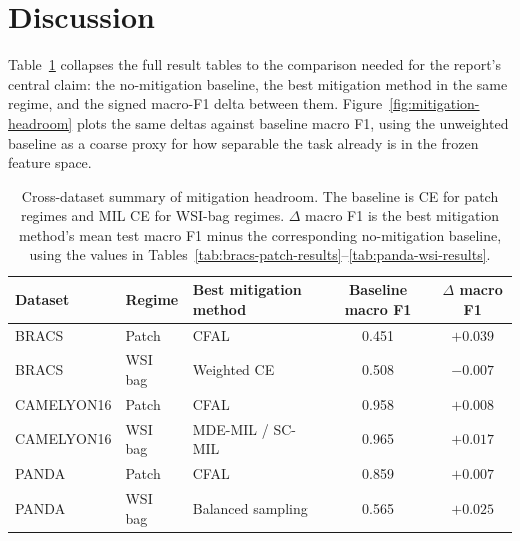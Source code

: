 \documentclass[11pt]{article}
\begin{document}
\begin{table}[ht]
  \centering
  \caption{PANDA native WSI-bag calibration: ECE before and after temperature scaling, with the fitted temperature $T$. Columns as in Table~\ref{tab:panda-calibration-patch}.}
  \label{tab:panda-calibration-wsi}
\end{table}

\section{Discussion}
\label{sec:discussion}
Table~\ref{tab:discussion-summary} collapses the full result tables to the comparison needed for the report's central claim: the no-mitigation baseline, the best mitigation method in the same regime, and the signed macro-F1 delta between them. Figure~\ref{fig:mitigation-headroom} plots the same deltas against baseline macro F1, using the unweighted baseline as a coarse proxy for how separable the task already is in the frozen feature space.

\begin{table}[ht]
  \centering
  \small
  \begin{tabularx}{\linewidth}{@{}llXcc@{}}
    \toprule
    Dataset & Regime & Best mitigation method & Baseline macro F1 & $\Delta$ macro F1\\
    \midrule
    BRACS & Patch & CFAL & \num{0.451} & $+\num{0.039}$\\
    BRACS & WSI bag & Weighted CE & \num{0.508} & $\num{-0.007}$\\
    CAMELYON16 & Patch & CFAL & \num{0.958} & $+\num{0.008}$\\
    CAMELYON16 & WSI bag & MDE-MIL / SC-MIL & \num{0.965} & $+\num{0.017}$\\
    PANDA & Patch & CFAL & \num{0.859} & $+\num{0.007}$\\
    PANDA & WSI bag & Balanced sampling & \num{0.565} & $+\num{0.025}$\\
    \bottomrule
  \end{tabularx}
  \caption{Cross-dataset summary of mitigation headroom. The baseline is CE for patch regimes and MIL CE for WSI-bag regimes. $\Delta$ macro F1 is the best mitigation method's mean test macro F1 minus the corresponding no-mitigation baseline, using the values in Tables~\ref{tab:bracs-patch-results}--\ref{tab:panda-wsi-results}.}
  \label{tab:discussion-summary}
\end{table}
\end{document}
